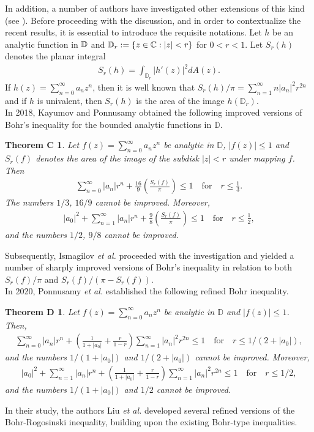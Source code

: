 \documentclass[11pt,reqno]{amsart}
\newtheorem*{theoC}{Theorem C}
\newtheorem*{theoD}{Theorem D}
\newtheorem{open problem}{Open problem}[section]
\newcommand{\D}{{\Bbb{D}}}
\newcommand{\C}{{\Bbb{C}}}
\newcommand{\beas}{\begin{eqnarray*}}
\newcommand{\eeas}{\end{eqnarray*}}
\numberwithin{equation}{section}
\begin{document}
In addition, a number of authors have investigated other extensions of this kind (see \cite{AKP2020,LLP2021,KKP2021}). Before proceeding with the discussion, and in order to contextualize the recent results, it is essential to introduce the requisite notations. Let $h$ be an analytic function
in $\D$ and $\D_r := \{z\in\C : |z| < r\}$ for $0<r< 1$. Let $S_ r(h)$ denotes the planar integral  
\beas S_ r(h)=\int_{\mathbb{D}_ r} |h'(z)|^2 dA(z).\eeas
If $h(z)=\sum_{n=0}^\infty a_n z^n$, then it is well known that $S_ r(h)/\pi=\sum_{n=1}^\infty n|a_n|^2  r^{2n}$ and if $h$ is univalent, then $S_ r(h)$ is the area of the image $h(\mathbb{D}_ r)$. \\[2mm]
In 2018, Kayumov and Ponnusamy \cite{1KP2018} obtained the following improved versions of Bohr's inequality for the bounded analytic functions in $\mathbb{D}$.
\begin{theoC}\cite{1KP2018}
Let $f(z)=\sum_{n=0}^{\infty} a_nz^n$ be analytic in $\mathbb{D}$, $|f(z)|\leq 1$ and $S_r(f)$ denotes the area of the image of the subdisk $|z|<r$ under mapping $f$. Then
\beas \sum_{n=0}^{\infty} |a_n|r^n+\frac{16}{9}\left(\frac{S_r(f)}{\pi}\right)\leq 1\quad\text{for}\quad r\leq\frac{1}{3}.\eeas
The numbers $1/3$, $16/9$ cannot be improved. Moreover, 
\beas |a_0|^2+\sum_{n=1}^{\infty} |a_n| r^n+\frac{9}{8}\left(\frac{S_r(f)}{\pi}\right)\leq 1\quad\text{for}\quad r\leq\frac{1}{2},\eeas
and the numbers $1/2$, $9/8$ cannot be improved. \end{theoC}
\noindent 
Subsequently, Ismagilov {\it et al.}\cite{IKP2020,IKKP2021} proceeded with the investigation and yielded a number of sharply improved versions of Bohr's inequality in relation to both $S_r(f)/\pi$ and $S_r(f)/(\pi-S_r(f))$.\\[2mm]
In 2020, Ponnusamy {\it et al.} \cite{PVW2020} established the following refined Bohr inequality.
\begin{theoD}\cite{PVW2020}  Let $f(z)=\sum_{n=0}^{\infty} a_nz^n$ be analytic in $\mathbb{D}$ and $|f(z)|\leq 1$. Then,
\beas \sum_{n=0}^\infty |a_n| r^n+\left(\frac{1}{1+|a_0|}+\frac{ r}{1- r}\right)\sum_{n=1}^\infty |a_n|^2  r^{2n}\leq 1\quad\text{for}\quad  r\leq 1/(2+|a_0|),\eeas
and the numbers $1/(1+|a_0|)$ and $1/(2+|a_0|)$ cannot be improved. Moreover,
\beas |a_0|^2+\sum_{n=1}^\infty |a_n| r^n+\left(\frac{1}{1+|a_0|}+\frac{ r}{1- r}\right)\sum_{n=1}^\infty |a_n|^2  r^{2n}\leq 1\quad\text{for}\quad  r\leq 1/2,\eeas
and the numbers $1/(1+|a_0|)$ and $1/2$ cannot be improved.\end{theoD}
In their study, the authors Liu {\it et al.} \cite{LLP2021} developed several refined versions of the Bohr-Rogosinski inequality, building upon the existing Bohr-type inequalities.
\end{document}

